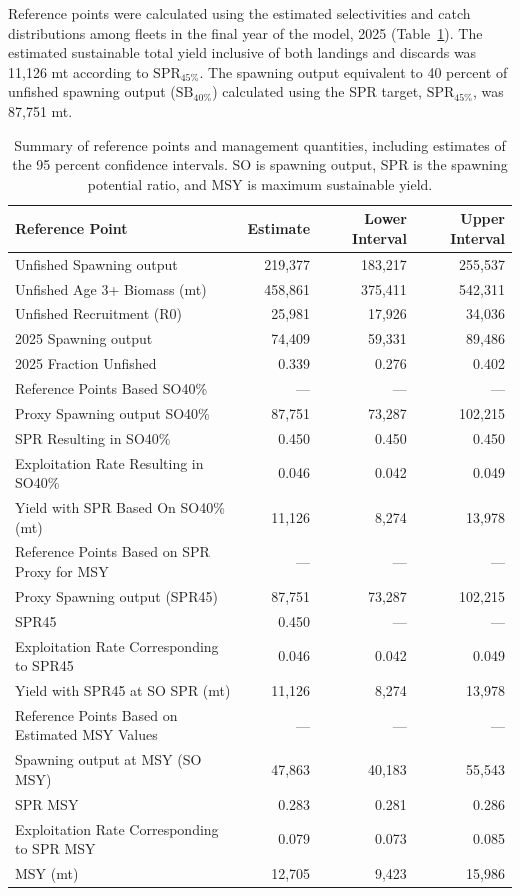 \documentclass[
  english,
]{article}
\begin{document}
Reference points were calculated using the estimated selectivities and
catch distributions among fleets in the final year of the model, 2025
(Table~\ref{tbl-ref-points-es}). The estimated sustainable total yield
inclusive of both landings and discards was 11,126 mt according to
\(\text{SPR}_{45\%}\). The spawning output equivalent to 40 percent of
unfished spawning output (\(\text{SB}_{40\%}\)) calculated using the SPR
target, \(\text{SPR}_{45\%}\), was 87,751 mt.

\begingroup
\fontsize{9.0pt}{11.0pt}\selectfont

\begin{longtable}{lrrr}

\caption{\label{tbl-ref-points-es}Summary of reference points and
management quantities, including estimates of the 95 percent confidence
intervals. SO is spawning output, SPR is the spawning potential ratio,
and MSY is maximum sustainable yield.}

\tabularnewline

\toprule
Reference Point & Estimate & Lower Interval & Upper Interval \\ 
\midrule\addlinespace[2.5pt]
Unfished Spawning output & 219,377 & 183,217 & 255,537 \\ 
Unfished Age 3+ Biomass (mt) & 458,861 & 375,411 & 542,311 \\ 
Unfished Recruitment (R0) & 25,981 & 17,926 & 34,036 \\ 
2025 Spawning output & 74,409 & 59,331 & 89,486 \\ 
2025 Fraction Unfished & 0.339 & 0.276 & 0.402 \\ 
Reference Points Based SO40\% & — & — & — \\ 
Proxy Spawning output SO40\% & 87,751 & 73,287 & 102,215 \\ 
SPR Resulting in SO40\% & 0.450 & 0.450 & 0.450 \\ 
Exploitation Rate Resulting in SO40\% & 0.046 & 0.042 & 0.049 \\ 
Yield with SPR Based On SO40\% (mt) & 11,126 & 8,274 & 13,978 \\ 
Reference Points Based on SPR Proxy for MSY & — & — & — \\ 
Proxy Spawning output (SPR45) & 87,751 & 73,287 & 102,215 \\ 
SPR45 & 0.450 & — & — \\ 
Exploitation Rate Corresponding to SPR45 & 0.046 & 0.042 & 0.049 \\ 
Yield with SPR45 at SO SPR (mt) & 11,126 & 8,274 & 13,978 \\ 
Reference Points Based on Estimated MSY Values & — & — & — \\ 
Spawning output at MSY (SO MSY) & 47,863 & 40,183 & 55,543 \\ 
SPR MSY & 0.283 & 0.281 & 0.286 \\ 
Exploitation Rate Corresponding to SPR MSY & 0.079 & 0.073 & 0.085 \\ 
MSY (mt) & 12,705 & 9,423 & 15,986 \\ 
\bottomrule

\end{longtable}
\end{document}
